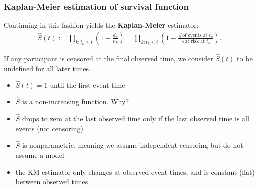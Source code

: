 \documentclass[10pt,t]{beamer}
\begin{document}
\begin{frame}
\frametitle{Kaplan-Meier estimation of survival function}

\vspace{-5 mm}

Continuing in this fashion yields the \textbf{Kaplan-Meier} estimator: 
\begin{align*}
\widehat{S}(t) := \prod_{k: t_k \leq t} \left(1 - \frac{d_k}{n_k} \right) = \prod_{k: t_k \leq t} \left(1 - \frac{\text{\# of events at $t_k$}}{\text{\# at risk at $t_k$}} \right) .
\end{align*}

If any participant is censored at the final observed time, we consider $\widehat{S}(t)$ to be undefined for all later times. 

\medskip


\begin{itemize}
\item $\widehat{S}(t) = 1$ until the first event time 
\medskip

\item $\widehat{S}$ is a non-increasing function. Why?  

\medskip
\item $\widehat{S}$ drops to zero at the last observed time only if the last observed time is all events (not censoring)  

\medskip
\item $\widehat{S}$ is nonparametric, meaning we assume independent censoring but do not assume a model

\medskip
\item the KM estimator only changes at observed event times, and is constant (flat) between observed times  
\end{itemize}
\end{frame}
\end{document}
